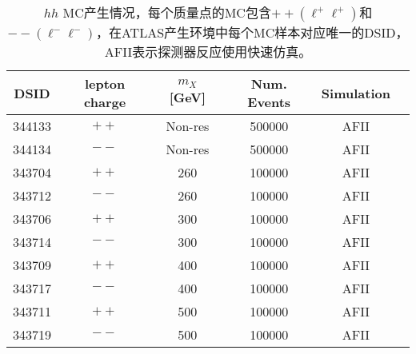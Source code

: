 \begin{table}
\centering
\small
\begin{tabular}{cccccc}
                        \hline
                        \hline
                        DSID & lepton charge & $m_X$ [GeV] & Num. Events & Simulation \\%
                        \hline
                        344133  &$++$  & Non-res &  500000 &  AFII \\%
                        344134  &$--$ & Non-res &  500000 &  AFII \\%
                        343704  &$++$ & 260     &  100000 &  AFII\\%
                        343712  &$--$ & 260     &  100000 &  AFII \\%
                        343706  &$++$ & 300     &  100000 &  AFII \\%
                        343714  &$--$ & 300     &  100000 &  AFII \\%
                        343709  &$++$ & 400     &  100000 &  AFII \\%
                        343717  &$--$ & 400     &  100000 &  AFII \\%
                        343711  &$++$ & 500     &  100000 &  AFII \\%
                        343719  &$--$ & 500     &  100000 &  AFII \\%
                        \hline
                        \hline
\end{tabular}
\caption{$hh$ MC产生情况，每个质量点的MC包含$++(\ell^+\ell^+)$和$--(\ell^-\ell^-)$，在ATLAS产生环境中每个MC样本对应唯一的DSID，AFII表示探测器反应使用快速仿真\cite{Lukas:2012kua}。}
\label{tab:dsid_hh}
\end{table}
